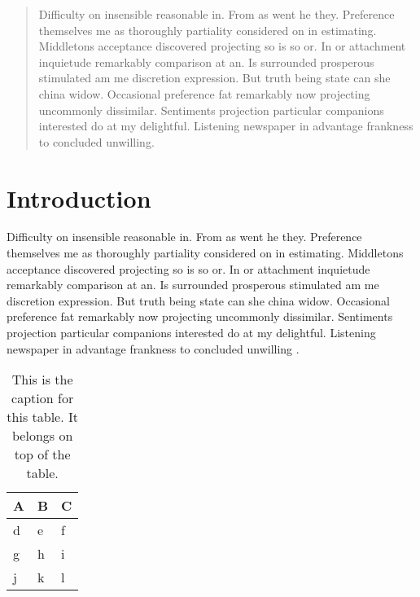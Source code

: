 \documentclass[11pt]{article}
\begin{document}

\begin{abstract}
    \noindent Difficulty on insensible reasonable in. From as went he they. Preference themselves me as thoroughly partiality considered on in estimating. Middletons acceptance discovered projecting so is so or. In or attachment inquietude remarkably comparison at an. Is surrounded prosperous stimulated am me discretion expression. But truth being state can she china widow. Occasional preference fat remarkably now projecting uncommonly dissimilar. Sentiments projection particular companions interested do at my delightful. Listening newspaper in advantage frankness to concluded unwilling.
\end{abstract}

\newpage
\section{Introduction}
Difficulty on insensible reasonable in. From as went he they. Preference themselves me as thoroughly partiality considered on in estimating. Middletons acceptance discovered projecting so is so or. In or attachment inquietude remarkably comparison at an. Is surrounded prosperous stimulated am me discretion expression. But truth being state can she china widow. Occasional preference fat remarkably now projecting uncommonly dissimilar. Sentiments projection particular companions interested do at my delightful. Listening newspaper in advantage frankness to concluded unwilling \cite{falkowski_kauwe_sparks_2021}. 

\begin{table}[!b]
    \caption{This is the caption for this table. It belongs on top of the table.}
    \centering
    \begin{tabu}{*{3}{X[c,m]}}
    \toprule
        \textbf{A} & \textbf{B} & \textbf{C} \\
    \midrule    
        d & e & f \\
        g & h & i \\
        j & k & l \\
    \bottomrule    
    \end{tabu}
    \label{tab:alpha-table}
\end{table}
\end{document}
